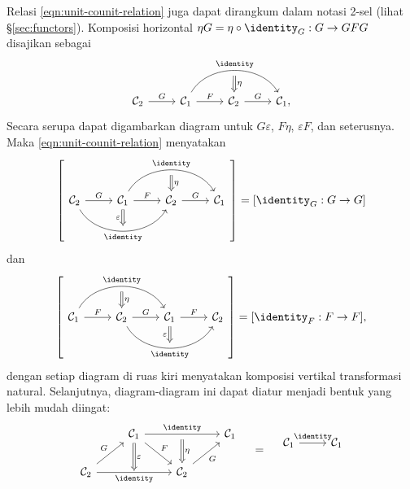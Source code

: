 \begin{remark}\label{rem:triangle-identity}
	Relasi \eqref{eqn:unit-counit-relation} juga dapat dirangkum dalam notasi 2-sel (lihat \S\ref{sec:functors}). Komposisi horizontal $\eta G = \eta  \circ \identity_G: G \to GFG$ disajikan sebagai
	\[ \begin{tikzcd}
		\mathcal{C}_2 \arrow[r, "G"] & \mathcal{C}_1 \arrow[r, "F"] \arrow[bend left=60, rr, "\identity", ""' name=I] & \mathcal{C}_2 \arrow[r, "G"] \arrow[Leftarrow, to path= -- (I) \tikztonodes, "\eta"'] & \mathcal{C}_1 ,
	\end{tikzcd} \]
	Secara serupa dapat digambarkan diagram untuk $G\varepsilon$, $F\eta$, $\varepsilon F$, dan seterusnya. Maka \eqref{eqn:unit-counit-relation} menyatakan
	\[ \left[ \begin{tikzcd}
		\mathcal{C}_2 \arrow[r, "G"] \arrow[bend right=60, rr, "" name=J, "\identity"'] &
		\mathcal{C}_1 \arrow[r, "F"] \arrow[bend left=60, rr, "\identity", ""' name=I] \arrow[Rightarrow, to path= --(J) \tikztonodes, "\varepsilon"'] &
		\mathcal{C}_2 \arrow[r, "G"] \arrow[Leftarrow, to path= -- (I) \tikztonodes, "\eta"'] &
		\mathcal{C}_1
	\end{tikzcd} \right] = [\identity_G: G \to G] \]
	dan
	\[ \left[ \begin{tikzcd}
		\mathcal{C}_1 \arrow[r, "F"] \arrow[bend left=60, rr, "\identity", ""' name=I] &
		\mathcal{C}_2 \arrow[r, "G"] \arrow[bend right=60, rr, "" name=J, "\identity"'] \arrow[Leftarrow, to path= -- (I) \tikztonodes, "\eta"'] &
		\mathcal{C}_1 \arrow[r, "F"] \arrow[Rightarrow, to path= --(J) \tikztonodes, "\varepsilon"'] &
		\mathcal{C}_2
	\end{tikzcd} \right] = [\identity_F: F \to F], \]
	dengan setiap diagram di ruas kiri menyatakan komposisi vertikal transformasi natural. Selanjutnya, diagram-diagram ini dapat diatur menjadi bentuk yang lebih mudah diingat:
	\begin{equation*} \begin{tikzcd}
		{} & \mathcal{C}_1 \arrow[rr, "\identity", ""' name=I] \arrow[rd, "F"] \arrow[Rightarrow, d, "\varepsilon"] & & \mathcal{C}_1 \\
		\mathcal{C}_2 \arrow[ru, "G"] \arrow[rr, "\identity"', "" name=J] & {} & \mathcal{C}_2 \arrow[ru, "G"'] \arrow[Leftarrow, to path= -- (I) \tikztonodes, "\eta"'] &
	\end{tikzcd} \quad = \quad
	\begin{tikzcd}
		\mathcal{C}_1 \arrow[r, "\identity"] & \mathcal{C}_1 \\

\end{tikzcd}
\end{equation*}
\end{remark}
